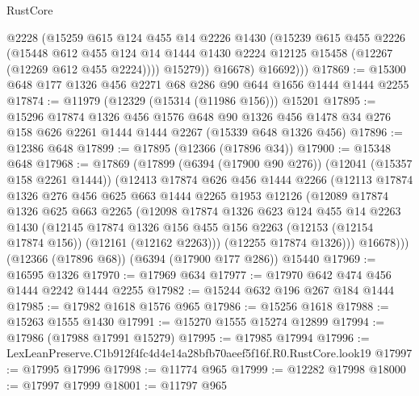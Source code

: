 \begin{lexlean}{RustCore}
\begin{coremodule}
              @2228
              (@15259
                @615
                @124
                @455
                @14
                @2226
                @1430
                (@15239
                  @615
                  @455
                  @2226
                  (@15448
                    @612
                    @455
                    @124
                    @14
                    @1444
                    @1430
                    @2224
                    @12125
                    @15458
                    (@12267 (@12269 @612 @455 @2224))))
                @15279))
            @16678)
          @16692)))
@17869 := @15300 @648 @177 @1326 @456 @2271 @68 @286 @90 @644 @1656 @1444 @1444 @2255
@17874 := @11979 (@12329 (@15314 (@11986 @156))) @15201
@17895 := @15296
    @17874
    @1326
    @456
    @1576
    @648
    @90
    @1326
    @456
    @1478
    @34
    @276
    @158
    @626
    @2261
    @1444
    @1444
    @2267
    (@15339 @648 @1326 @456)
@17896 := @12386 @648
@17899 := @17895 (@12366 (@17896 @34))
@17900 := @15348 @648
@17968 := @17869
    (@17899
      (@6394 (@17900 @90 @276))
      (@12041 (@15357 @158 @2261 @1444))
      (@12413
        @17874
        @626
        @456
        @1444
        @2266
        (@12113
          @17874
          @1326
          @276
          @456
          @625
          @663
          @1444
          @2265
          @1953
          @12126
          (@12089
            @17874
            @1326
            @625
            @663
            @2265
            (@12098
              @17874
              @1326
              @623
              @124
              @455
              @14
              @2263
              @1430
              (@12145
                @17874
                @1326
                @156
                @455
                @156
                @2263
                (@12153 (@12154 @17874 @156))
                (@12161 (@12162 @2263)))
              (@12255 @17874 @1326)))
          @16678)))
    (@12366 (@17896 @68))
    (@6394 (@17900 @177 @286))
    @15440
@17969 := @16595 @1326
@17970 := @17969 @634
@17977 := @17970 @642 @474 @456 @1444 @2242 @1444 @2255
@17982 := @15244 @632 @196 @267 @184 @1444
@17985 := @17982 @1618 @1576 @965
@17986 := @15256 @1618
@17988 := @15263 @1555 @1430
@17991 := @15270 @1555 @15274 @12899
@17994 := @17986 (@17988 @17991 @15279)
@17995 := @17985 @17994
@17996 := LexLeanPreserve.C1b912f4fc4d4e14a28bfb70aeef5f16f.R0.RustCore.look19
@17997 := @17995 @17996
@17998 := @11774 @965
@17999 := @12282 @17998
@18000 := @17997 @17999
@18001 := @11797 @965

\end{coremodule}
\end{lexlean}
